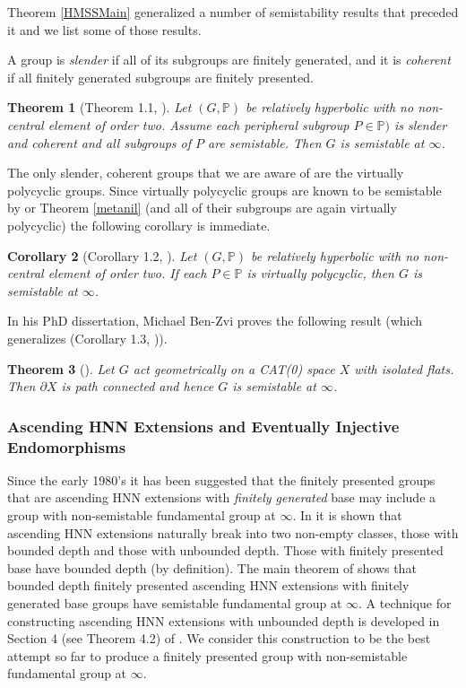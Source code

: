 \documentclass[12pt]{article}
\newtheorem{theorem}{Theorem}[subsection]
\newtheorem{corollary}[theorem]{Corollary}
\begin{document}
Theorem \ref{HMSSMain} generalized a number of semistability results that preceded it and we list some of those results.

A group is {\it slender} if all of its subgroups are finitely generated, and it is {\it coherent} if all finitely generated subgroups are finitely presented.

\begin{theorem} 
[Theorem 1.1, \cite{HR17}] Let $(G,\mathbb P)$ be relatively hyperbolic with no non-central element of order two. Assume each peripheral subgroup $P\in\mathbb P)$ is slender and coherent and all subgroups of $P$ are semistable. Then $G$ is semistable at $\infty$. 
\end{theorem}

The only slender, coherent groups that we are aware of are the virtually polycyclic groups. Since virtually polycyclic groups are known to be semistable by \cite{M1} or Theorem \ref{metanil} (and all of their subgroups are again virtually polycyclic) the following corollary is immediate. 

\begin{corollary} 
[Corollary 1.2, \cite{HR17}] Let $(G,\mathbb P)$ be relatively hyperbolic with no non-central element of order two. If each $P\in \mathbb P$ is virtually polycyclic, then $G$ is semistable at $\infty$.
\end{corollary}

In his PhD dissertation, Michael Ben-Zvi proves the following result (which generalizes (Corollary 1.3, \cite{HR17})).
\begin{theorem} [\cite{BZ19}]
Let $G$ act geometrically on a CAT(0) space $X$ with isolated flats. Then $\partial X$ is path connected and hence $G$ is semistable at $\infty$.
\end{theorem}



\subsubsection{Ascending HNN Extensions and Eventually Injective Endomorphisms}\label{AHNNE}
Since the early 1980's it has been suggested that the finitely presented groups that are ascending HNN extensions with {\it finitely generated} base may include a group with non-semistable fundamental group at $\infty$. In \cite{M7} it is shown that ascending HNN extensions naturally break into two non-empty classes, those with bounded depth and those with unbounded depth. Those with finitely presented base have bounded depth (by definition). The main theorem of \cite{M7} shows that bounded depth finitely presented ascending HNN extensions with  finitely generated base groups have semistable fundamental group at $\infty$.  A technique for constructing ascending HNN extensions with unbounded depth is developed in Section 4 (see Theorem 4.2) of \cite{M7}. We consider this  construction to be the best attempt so far to produce a finitely presented group with non-semistable fundamental group at $\infty$. 
\end{document}
